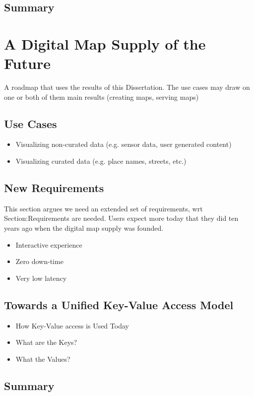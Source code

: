 \documentclass[11pt, oneside]{report}
\begin{document}
\subsection{Summary}

\section{A Digital Map Supply of the Future}
A roadmap that uses the results of this Dissertation. The use cases may draw on one or both of them main results (creating maps, serving maps)

\subsection{Use Cases}
\begin{itemize}
\item Visualizing non-curated data (e.g. sensor data, user generated content)
\item Visualizing curated data (e.g. place names, streets, etc.)
\end{itemize}

\subsection{New Requirements}
This section argues we need an extended set of requirements, wrt Section:Requirements are needed. Users expect more today that they did ten years ago when the digital map supply was founded.
\begin{itemize}
\item Interactive experience
\item Zero down-time
\item Very low latency
\end{itemize}

\subsection{Towards a Unified Key-Value Access Model}
\begin{itemize}
\item How Key-Value access is Used Today
\item What are the Keys?
\item What the Values?
\end{itemize}

\subsection{Summary}
\end{document}
